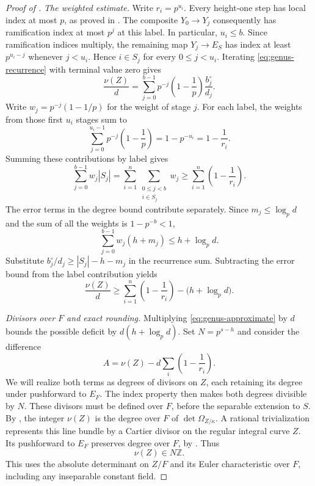 \begin{proof}[Proof of ]
\textit{The weighted estimate.}
Write $r_i=p^{u_i}$.  Every height-one step has local index at most
$p$, as proved in . The composite
$Y_0\to Y_j$ consequently has ramification index at most $p^j$ at
this label. In particular, $u_i\leq b$. Since ramification indices
multiply, the remaining map
$Y_j\to E_S$ has index at least $p^{u_i-j}$ whenever $j<u_i$.
Hence $i\in S_j$ for every $0\le j<u_i$. Iterating
\eqref{eq:genus-recurrence} with terminal value zero gives
\[
 \frac{\nu(Z)}d
  =\sum_{j=0}^{b-1}
      p^{-j}\left(1-\frac1p\right)\frac{b_j^\circ}{d_j}.
\]
Write $w_j=p^{-j}(1-1/p)$ for the weight of stage $j$. For each
label, the weights from those first $u_i$ stages sum to
\[
 \sum_{j=0}^{u_i-1}p^{-j}\left(1-\frac1p\right)
      =1-p^{-u_i}=1-\frac1{r_i}.
\]
Summing these contributions by label gives
\[
 \sum_{j=0}^{b-1}w_j|S_j|
  =\sum_{i=1}^n\sum_{\substack{0\leq j<b\\i\in S_j}}w_j
  \geq\sum_{i=1}^n\left(1-\frac1{r_i}\right).
\]
The error terms in the degree bound contribute separately. Since
$m_j\le\log_p d$ and the sum of all the weights is $1-p^{-b}<1$,
\[
 \sum_{j=0}^{b-1}w_j(h+m_j)\leq h+\log_p d.
\]
Substitute $b_j^\circ/d_j\geq |S_j|-h-m_j$ in the recurrence sum.
Subtracting the error bound from the label contribution yields
\begin{equation}
 \frac{\nu(Z)}d
   \ge\sum_{i=1}^n\left(1-\frac1{r_i}\right)
          -\bigl(h+\log_p d\bigr).
 \label{eq:genus-approximate}
\end{equation}

\textit{Divisors over $F$ and exact rounding.}
Multiplying \eqref{eq:genus-approximate} by $d$ bounds the possible
deficit by $d(h+\log_p d)$. Set $N=p^{s-h}$ and consider the difference
\[
 A=\nu(Z)-d\sum_i\left(1-\frac1{r_i}\right).
\]
We will realize both terms as degrees of divisors on $Z$, each
retaining its degree under pushforward to $E_F$. The index property
 then makes both degrees divisible by
$N$. These divisors must be defined over $F$, before the separable
extension to $S$.
By , the integer $\nu(Z)$ is the degree over
$F$ of $\det\Omega_{Z/\kappa}$.  A rational trivialization represents
this line bundle by a Cartier divisor on the regular integral curve
$Z$.  Its pushforward to $E_F$ preserves degree over $F$, by
.  Thus
\[
 \nu(Z)\in N\mathbb Z.
\]
This uses the absolute determinant on $Z/F$ and its Euler
characteristic over $F$, including any inseparable constant field.


\end{proof}
